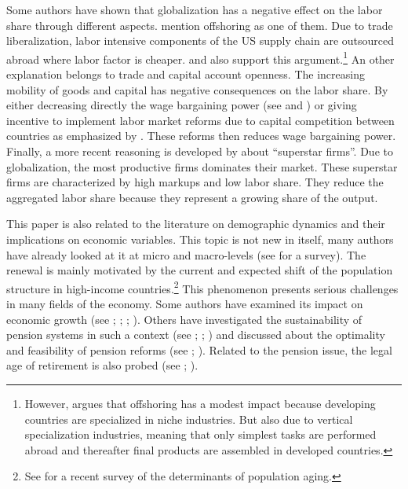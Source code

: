 Some authors have shown that globalization has a negative effect on the labor share through different aspects. \cite{Elsby2013} mention offshoring as one of them. Due to trade liberalization, labor intensive components of the US supply chain are outsourced abroad where labor factor is cheaper. \cite{Krugman2008} and \cite{Bassanini2014} also support this argument.\footnote{However, \cite{Krugman2008} argues that offshoring has a modest impact because developing countries are specialized in niche industries. But also due to vertical specialization industries, meaning that only simplest tasks are performed abroad and thereafter final products are assembled in developed countries.} An other explanation belongs to trade and capital account openness. The increasing mobility of goods and capital has negative consequences on the labor share. By either decreasing directly the wage bargaining power (see \citealt{Jayadev2007} and \citealt{Young2018}) or giving incentive to implement labor market reforms due to capital competition between countries as emphasized by \cite{Pica2010}. These reforms then reduces wage bargaining power. Finally, a more recent reasoning is developed by \cite{Autor2019} about ``superstar firms''. Due to globalization, the most productive firms dominates their market. These superstar firms are characterized by high markups and low labor share. They reduce the aggregated labor share because they represent a growing share of the output.

This paper is also related to the literature on demographic dynamics and their implications on economic variables. This topic is not new in itself, many authors have already looked at it at micro and macro-levels (see \citealt{Clark1978} for a survey). The renewal is mainly motivated by the current and expected shift of the population structure in high-income countries.\footnote{See \cite{Bloom2016} for a recent survey of the determinants of population aging.} This phenomenon presents serious challenges in many fields of the economy. Some authors have examined its impact on economic growth (see \citealt{VanGroezen2005}; \citealt{Soares2005}; \citealt{Bloom2010}; \citealt{Lee2010}). Others have investigated the sustainability of pension systems in such a context (see \citealt{Ono2003}; \citealt{DelaCroix2013}; \citealt{Philipov2014}) and discussed about the optimality and feasibility of pension reforms (see \citealt{Pecchenino1997}; \citealt{Sinn2003}). Related to the pension issue, the legal age of retirement is also probed (see \citealt{Futagami2001}; \citealt{Dedry2017}).

